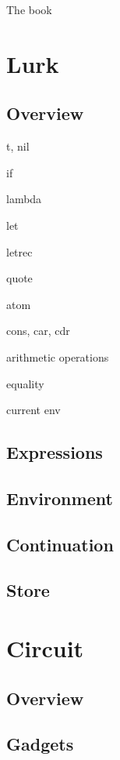 \documentclass[10pt, english]{article}
\begin{document}
The book~\cite{FWbook}

\section{Lurk}

\subsection{Overview}

t, nil

if

lambda

let

letrec

quote

atom

cons, car, cdr

arithmetic operations

equality

current env


\subsection{Expressions}

\subsection{Environment}

\subsection{Continuation}

\subsection{Store}

\section{Circuit}

\subsection{Overview}

\subsection{Gadgets}
\end{document}
